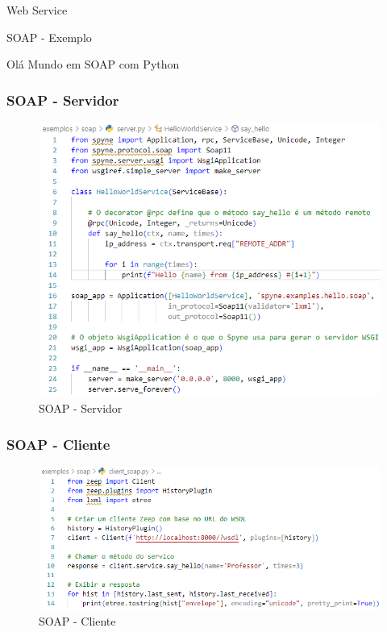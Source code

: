 \documentclass[
	10pt, %
	t, %
]{beamer}
\begin{document}
\begin{frame}
	\begin{center}
		
		\bigskip\bigskip\bigskip\bigskip %
		{\Large Web Service}
		
		\bigskip\bigskip %
		{\Huge SOAP - Exemplo}
		
		\smallskip
		{\small Olá Mundo em SOAP com Python} 
	\end{center}

\end{frame}

\begin{frame}[fragile]
	\frametitle{SOAP - Servidor}
	
	\begin{figure}
		\includegraphics[width=0.7\linewidth]{server_soap.PNG}
		\caption{SOAP - Servidor}
		\label{fig:soap_server}
	\end{figure}

\end{frame}

\begin{frame}[fragile]
	\frametitle{SOAP - Cliente}
	
	\begin{figure}
		\includegraphics[width=0.9\linewidth]{client_soap.PNG}
		\caption{SOAP - Cliente}
		\label{fig:soap_client}
	\end{figure}

\end{frame}
\end{document}
